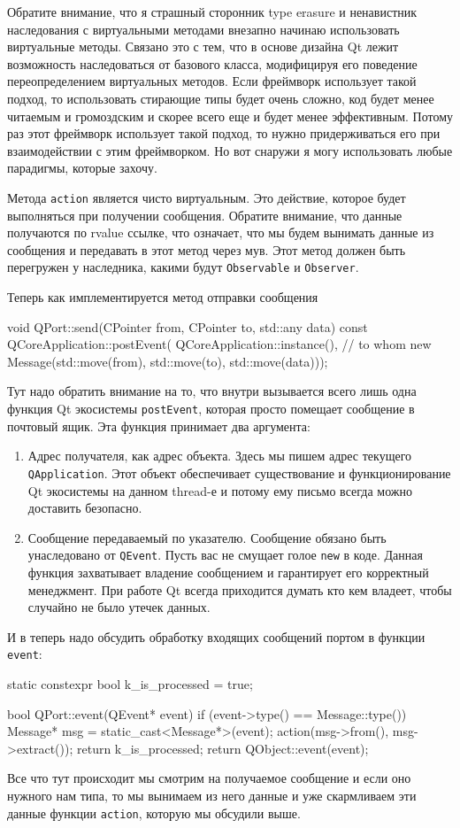 Обратите внимание, что я страшный сторонник type erasure и ненавистник наследования с виртуальными методами внезапно начинаю использовать виртуальные методы.
Связано это с тем, что в основе дизайна Qt лежит возможность наследоваться от базового класса, модифицируя его поведение переопределением виртуальных методов.
Если фреймворк использует такой подход, то использовать стирающие типы будет очень сложно, код будет менее читаемым и громоздским и скорее всего еще и будет менее эффективным.
Потому раз этот фреймворк использует такой подход, то нужно придерживаться его при взаимодействии с этим фреймворком.
Но вот снаружи я могу использовать любые парадигмы, которые захочу.

Метода \verb"action" является чисто виртуальным.
Это действие, которое будет выполняться при получении сообщения.
Обратите внимание, что данные получаются по rvalue ссылке, что означает, что мы будем вынимать данные из сообщения и передавать в этот метод через мув.
Этот метод должен быть перегружен у наследника, какими будут \verb"Observable" и \verb"Observer".

Теперь как имплементируется метод отправки сообщения
\begin{cppcode}
void QPort::send(CPointer from, CPointer to, std::any data) const {
  QCoreApplication::postEvent(
      QCoreApplication::instance(), // to whom
      new Message(std::move(from), std::move(to), std::move(data)));
}
\end{cppcode}
Тут надо обратить внимание на то, что внутри вызывается всего лишь одна функция Qt экосистемы \verb"postEvent", которая просто помещает сообщение в почтовый ящик.
Эта функция принимает два аргумента:
\begin{enumerate}
\item Адрес получателя, как адрес объекта.
Здесь мы пишем адрес текущего \verb"QApplication".
Этот объект обеспечивает существование и функционирование Qt экосистемы на данном thread-е и потому ему письмо всегда можно доставить безопасно.

\item Сообщение передаваемый по указателю.
Сообщение обязано быть унаследовано от \verb"QEvent".
Пусть вас не смущает голое \verb"new" в коде.
Данная функция захватывает владение сообщением и гарантирует его корректный менеджмент.
При работе Qt всегда приходится думать кто кем владеет, чтобы случайно не было утечек данных.
\end{enumerate}

И в теперь надо обсудить обработку входящих сообщений портом в функции \verb"event":
\begin{cppcode}
static constexpr bool k_is_processed = true;

bool QPort::event(QEvent* event) {
  if (event->type() == Message::type()) {
    Message* msg = static_cast<Message*>(event);
    action(msg->from(), msg->extract());
    return k_is_processed;
  }
  return QObject::event(event);
}
\end{cppcode}
Все что тут происходит мы смотрим на получаемое сообщение и если оно нужного нам типа, то мы вынимаем из него данные и уже скармливаем эти данные функции \verb"action", которую мы обсудили выше.

